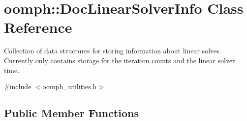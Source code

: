 \hypertarget{classoomph_1_1DocLinearSolverInfo}{}\section{oomph\+:\+:Doc\+Linear\+Solver\+Info Class Reference}
\label{classoomph_1_1DocLinearSolverInfo}


Collection of data structures for storing information about linear solves. Currently only contains storage for the iteration counts and the linear solver time.  




{\ttfamily \#include $<$oomph\+\_\+utilities.\+h$>$}

\subsection*{Public Member Functions}
